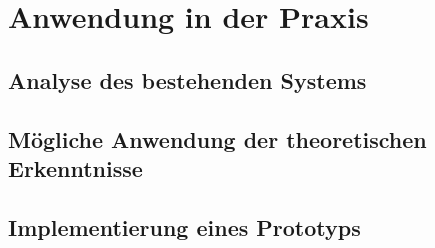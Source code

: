 \section{Anwendung in der Praxis}
\subsection{Analyse des bestehenden Systems}
\subsection{Mögliche Anwendung der theoretischen Erkenntnisse}
\subsection{Implementierung eines Prototyps}


 
